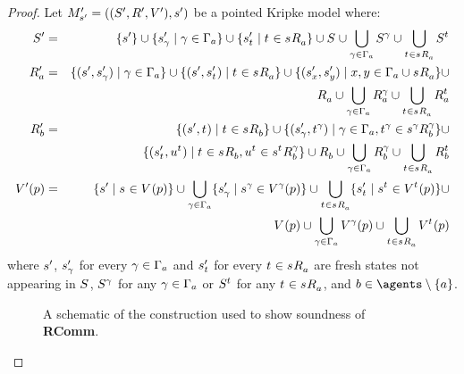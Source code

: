 \begin{proof}
Let $\kPModelAndTupleP{\kStateSP}$ be a pointed Kripke model where:
\begin{eqnarray*}
    \kStatesP &=& \{\kStateSP\} \cup \{\kStateSP_\gamma \mid \gamma \in \Gamma_\agentA\} \cup \{\kStateSP_{\kStateT} \mid \kStateT \in \kSuccessorsA{\kStateS}\} \cup \kStates \cup \bigcup_{\gamma \in \Gamma_\agentA} \kStates[\gamma] \cup \bigcup_{\kStateT \in \kSuccessorsA{\kStateS}} \kStates[\kStateT]\\
    \kAccessibilityPA &=& \{(\kStateSP, \kStateSP_\gamma) \mid \gamma \in \Gamma_\agentA\} \cup \{(\kStateSP, \kStateSP_{\kStateT}) \mid \kStateT \in \kSuccessorsA{\kStateS}\} \cup \{(\kStateSP_x, \kStateSP_y) \mid x, y \in \Gamma_\agentA \cup \kSuccessorsA{\kStateS}\} \cup \\&&\quad \kAccessibilityA \cup \bigcup_{\gamma \in \Gamma_\agentA} \kAccessibilityA[\gamma] \cup \bigcup_{\kStateT \in \kSuccessorsA{\kStateS}} \kAccessibilityA[\kStateT]\\
    \kAccessibilityPB &=& \{(\kStateSP, \kStateT) \mid \kStateT \in \kSuccessorsB{\kStateS}\} \cup \{(\kStateSP_\gamma, \kStateT[\gamma]) \mid \gamma \in \Gamma_\agentA, \kStateT[\gamma] \in \kSuccessorsB[\gamma]{\kStateS[\gamma]}\} \cup \\&&\quad \{(\kStateSP_{\kStateT}, \kStateU[\kStateT]) \mid \kStateT \in \kSuccessorsB{\kStateS}, \kStateU[\kStateT] \in \kSuccessorsB[\gamma]{\kStateS[\kStateT]}\} \cup \kAccessibilityB \cup \bigcup_{\gamma \in \Gamma_\agentA} \kAccessibilityB[\gamma] \cup \bigcup_{\kStateT \in \kSuccessorsA{\kStateS}} \kAccessibilityB[\kStateT]\\
    \kValuationP(\atomP) &=& \{\kStateSP \mid \kStateS \in \kValuation(\atomP)\} \cup \bigcup_{\gamma \in \Gamma_\agentA} \{\kStateSP_\gamma \mid \kStateS[\gamma] \in \kValuation[\gamma](\atomP)\} \cup \bigcup_{\kStateT \in \kSuccessorsA{\kStateS}} \{\kStateSP_{\kStateT} \mid \kStateS[\kStateT] \in \kValuation[\kStateT](\atomP)\} \cup \\&&\quad \kValuation(\atomP) \cup \bigcup_{\gamma \in \Gamma_\agentA} \kValuation[\gamma](\atomP) \cup \bigcup_{\kStateT \in \kSuccessorsA{\kStateS}} \kValuation[\kStateT](\atomP)
\end{eqnarray*}
where $\kStateSP$, $\kStateSP_\gamma$ for every $\gamma \in \Gamma_\agentA$ and $\kStateSP_{\kStateT}$ for every $\kStateT \in \kSuccessorsA{\kStateS}$ are fresh states not appearing in $\kStates$, $\kStates[\gamma]$ for any $\gamma \in \Gamma_\agentA$ or $\kStates[\kStateT]$ for any $\kStateT \in \kSuccessorsA{\kStateS}$, and $\agentB \in \agents \setminus \{\agentA\}$.
\begin{figure}
    \caption{A schematic of the construction used to show soundness of {\bf RComm}.}\label{rml-k45-rcomm-construction}
    \centering
    \begin{tikzpicture}[>=stealth',shorten >=1pt,auto,node distance=7em,thick]


\end{tikzpicture}
\end{figure}
\end{proof}
